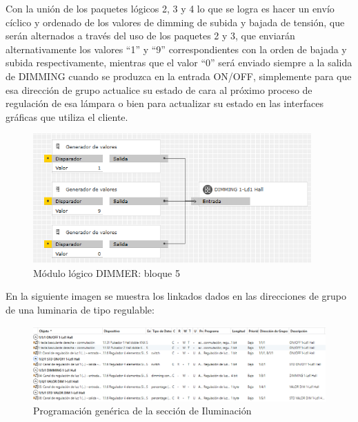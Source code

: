 \begin{itemize}
\begin{center}
\begin{figure}[H]
\label{fig:log_dimm_b4}
\end{figure}
\end{center}
Con la unión de los paquetes lógicos 2, 3 y 4 lo que se logra es hacer un envío cíclico y ordenado de los valores de dimming de subida y bajada de tensión, que serán alternados a través del uso de los paquetes 2 y 3, que enviarán alternativamente los valores “1” y “9” correspondientes con la orden de bajada y subida respectivamente, mientras que el valor “0” será enviado siempre a la salida de DIMMING cuando se produzca en la entrada ON/OFF, simplemente para que esa dirección de grupo actualice su estado de cara al próximo proceso de regulación de esa lámpara o bien para actualizar su estado en las interfaces gráficas que utiliza el cliente.
 \begin{center}
\begin{figure}[H]
\includegraphics[width=0.95\textwidth]{figures/log_dimm_b5.png}   
\caption{Módulo lógico DIMMER: bloque 5}
\label{fig:log_dimm_b5}
\end{figure}
\end{center}
En la siguiente imagen se muestra los linkados dados en las direcciones de grupo de una luminaria de tipo regulable:
 \begin{center}
\begin{figure}[H]
\includegraphics[width=1.15\textwidth]{figures/prog_dim.png}   
\caption{Programación genérica de la sección de Iluminación}
\label{fig:prog_dim}
\end{figure}
\end{center}


\end{itemize}
